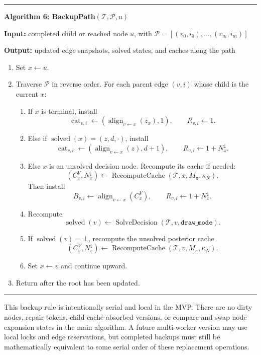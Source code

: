 \documentclass[11pt]{article}
\newcommand{\Tree}{\mathcal{T}}
\newcommand{\Path}{\mathcal{P}}
\newcommand{\Align}{\operatorname{align}}
\newcommand{\Solved}{\operatorname{solved}}
\newcommand{\Cat}{\operatorname{cat}}
\newcommand{\SolveDecision}{\operatorname{SolveDecision}}
\newcommand{\RecomputeCache}{\operatorname{RecomputeCache}}
\newenvironment{algorithmblock}[1]
{
  \par\medskip
  \noindent\hrule\par\smallskip
  \noindent\textbf{#1}
  \par\smallskip
}
{
  \par\smallskip\noindent\hrule\par\medskip
}
\newcommand{\Input}{\textbf{Input: }}
\newcommand{\Output}{\textbf{Output: }}
\begin{document}
\begin{algorithmblock}{Algorithm 6: BackupPath\((\Tree,\Path,u)\)}

\Input completed child or reached node \(u\), with \(\Path=[(v_0,i_0),\ldots,(v_m,i_m)]\)

\Output updated edge snapshots, solved states, and caches along the path

\begin{enumerate}[leftmargin=2em]
  \item Set \(x\gets u\).

  \item Traverse \(\Path\) in reverse order. For each parent edge \((v,i)\) whose
  child is the current \(x\):
  \begin{enumerate}[leftmargin=2em]
    \item If \(x\) is terminal, install
    \[
    \Cat_{v,i}\gets(\Align_{v\leftarrow x}(z_x),1),
    \qquad
    R_{v,i}\gets 1.
    \]

    \item Else if \(\Solved(x)=(z,d,\cdot)\), install
    \[
    \Cat_{v,i}\gets(\Align_{v\leftarrow x}(z),d+1),
    \qquad
    R_{v,i}\gets1+N^\downarrow_x.
    \]

    \item Else \(x\) is an unsolved decision node. Recompute its cache if needed:
    \[
    (C^V_x,N^\downarrow_x)\gets\RecomputeCache(\Tree,x,M_\pi,\kappa_N).
    \]
    Then install
    \[
    B_{v,i}\gets\Align_{v\leftarrow x}(C^V_x),
    \qquad
    R_{v,i}\gets1+N^\downarrow_x.
    \]

    \item Recompute
    \[
    \Solved(v)\gets\SolveDecision(\Tree,v,\texttt{draw\_mode}).
    \]

    \item If \(\Solved(v)=\bot\), recompute the unsolved posterior cache
    \[
    (C^V_v,N^\downarrow_v)\gets\RecomputeCache(\Tree,v,M_\pi,\kappa_N).
    \]

    \item Set \(x\gets v\) and continue upward.
  \end{enumerate}

  \item Return after the root has been updated.
\end{enumerate}

\end{algorithmblock}

This backup rule is intentionally serial and local in the MVP. There are no
dirty nodes, repair tokens, child-cache absorbed versions, or compare-and-swap
node expansion states in the main algorithm. A future multi-worker version may
use local locks and edge reservations, but completed backups must still be
mathematically equivalent to some serial order of these replacement operations.
\end{document}
